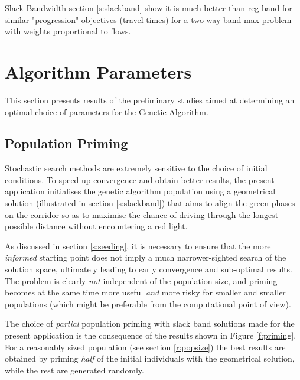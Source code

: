 
Slack Bandwidth section \ref{s:slackband} show it is much better than reg band for similar "progression" objectives (travel times) for a two-way band max problem with weights proportional to flows. 

\section{Algorithm Parameters}
This section presents results of the preliminary studies aimed at determining an optimal choice of parameters for the Genetic Algorithm.

\subsection{Population Priming} \label{s:poppriming}
Stochastic search methods are extremely sensitive to the choice of initial conditions. To speed up convergence and obtain better results, the present application initialises the genetic algorithm population using a geometrical solution (illustrated in section \ref{s:slackband}) that aims to align the green phases on the corridor so as to maximise the chance of driving through the longest possible distance without encountering a red light.

As discussed in section \ref{s:seeding}, it is necessary to ensure that the more \emph{informed} starting point does not imply a much narrower-sighted search of the solution space, ultimately leading to early convergence and sub-optimal results. The problem is clearly \emph{not} independent of the population size, and priming becomes at the same time more useful \emph{and} more risky for smaller and smaller populations (which might be preferable from the computational point of view).

The choice of \emph{partial} population priming with slack band solutions made for the present application is the consequence of the results shown in Figure \ref{f:priming}. For a reasonably sized population (see section \ref{r:popsize}) the best results are obtained by priming \emph{half} of the initial individuals with the geometrical solution, while the rest are generated randomly. 


